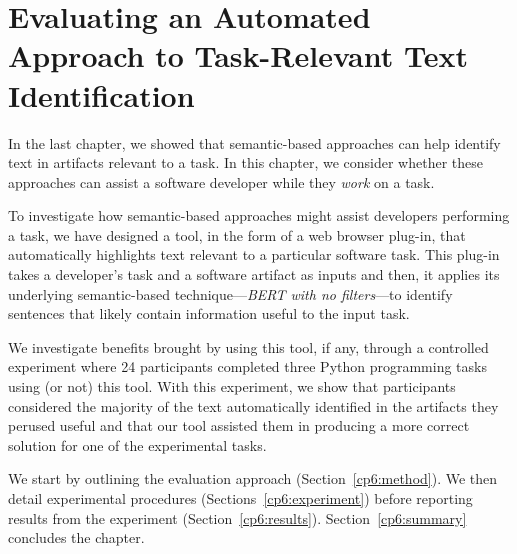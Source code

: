 \setcounter{chapter}{5}


\chapter{Evaluating an Automated Approach to Task-Relevant Text Identification}
\label{ch:assisting}


In the last chapter, we showed that semantic-based approaches can help identify text in artifacts relevant to a task. 
In this chapter, we consider whether these approaches can assist a software developer while they \textit{work} on a task.



To investigate how semantic-based approaches might assist developers performing a task, we have designed a tool, in the form of a web browser plug-in, that automatically highlights 
text relevant to a particular software task.
This plug-in takes a developer's task and a software artifact as inputs and then, it applies its underlying semantic-based technique---\textit{BERT with no filters}---to identify sentences that likely contain information useful to the input task.

We investigate benefits brought by using this tool, if any, through a controlled experiment
where 24 participants completed three Python programming tasks using (or not) this tool. 
With this experiment, we show that participants considered the majority of the text automatically identified in the artifacts 
they perused useful and that 
our tool assisted them in producing a more correct solution for one of the experimental tasks.



We start by outlining the evaluation approach  (Section~\ref{cp6:method}). We then
detail experimental procedures  (Sections~\ref{cp6:experiment}) before reporting
results from the experiment 
(Section~\ref{cp6:results}).
Section~\ref{cp6:summary} concludes the chapter.





%     









